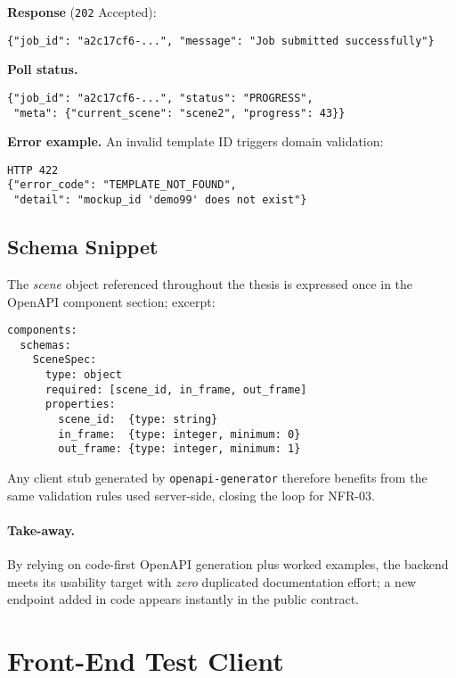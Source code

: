 \textbf{Response} (\texttt{202} Accepted):
\begin{lstlisting}
{"job_id": "a2c17cf6-...", "message": "Job submitted successfully"}
\end{lstlisting}

\textbf{Poll status.}

\begin{lstlisting}
{"job_id": "a2c17cf6-...", "status": "PROGRESS",
 "meta": {"current_scene": "scene2", "progress": 43}}
\end{lstlisting}

\textbf{Error example.}
An invalid template ID triggers domain validation:

\begin{lstlisting}
HTTP 422
{"error_code": "TEMPLATE_NOT_FOUND",
 "detail": "mockup_id 'demo99' does not exist"}
\end{lstlisting}

\subsection{Schema Snippet}

The \textit{scene} object referenced throughout the thesis is expressed once
in the OpenAPI component section; excerpt:

\begin{lstlisting}
components:
  schemas:
    SceneSpec:
      type: object
      required: [scene_id, in_frame, out_frame]
      properties:
        scene_id:  {type: string}
        in_frame:  {type: integer, minimum: 0}
        out_frame: {type: integer, minimum: 1}
\end{lstlisting}

Any client stub generated by \texttt{openapi-generator} therefore benefits from
the same validation rules used server-side, closing the loop for NFR-03.

\paragraph{Take-away.}
By relying on code-first OpenAPI generation plus worked examples, the backend
meets its usability target with \emph{zero} duplicated documentation effort; a
new endpoint added in code appears instantly in the public contract.

\section{Front-End Test Client}
\label{sec:impl-frontend}

